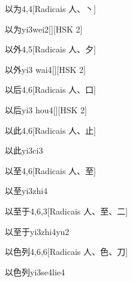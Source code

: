 \begin{entry}{以为}{4,4}[Radicais ⼈、⼂]
  \begin{phonetics}{以为}{yi3wei2}[][HSK 2]
  \end{phonetics}
\end{entry}

\begin{entry}{以外}{4,5}[Radicais ⼈、⼣]
  \begin{phonetics}{以外}{yi3 wai4}[][HSK 2]
  \end{phonetics}
\end{entry}

\begin{entry}{以后}{4,6}[Radicais ⼈、⼝]
  \begin{phonetics}{以后}{yi3 hou4}[][HSK 2]
  \end{phonetics}
\end{entry}

\begin{entry}{以此}{4,6}[Radicais ⼈、⽌]
  \begin{phonetics}{以此}{yi3ci3}
  \end{phonetics}
\end{entry}

\begin{entry}{以至}{4,6}[Radicais ⼈、⾄]
  \begin{phonetics}{以至}{yi3zhi4}
  \end{phonetics}
\end{entry}

\begin{entry}{以至于}{4,6,3}[Radicais ⼈、⾄、⼆]
  \begin{phonetics}{以至于}{yi3zhi4yu2}
  \end{phonetics}
\end{entry}

\begin{entry}{以色列}{4,6,6}[Radicais ⼈、⾊、⼑]
  \begin{phonetics}{以色列}{yi3se4lie4}
  \end{phonetics}
\end{entry}

